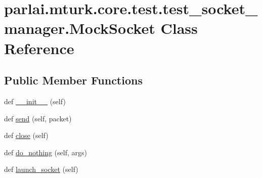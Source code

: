 \hypertarget{classparlai_1_1mturk_1_1core_1_1test_1_1test__socket__manager_1_1MockSocket}{}\section{parlai.\+mturk.\+core.\+test.\+test\+\_\+socket\+\_\+manager.\+Mock\+Socket Class Reference}
\label{classparlai_1_1mturk_1_1core_1_1test_1_1test__socket__manager_1_1MockSocket}
\subsection*{Public Member Functions}
\begin{DoxyCompactItemize}
\item 
def \hyperlink{classparlai_1_1mturk_1_1core_1_1test_1_1test__socket__manager_1_1MockSocket_acddeda4f4770f8e85882192453fc899c}{\+\_\+\+\_\+init\+\_\+\+\_\+} (self)
\item 
def \hyperlink{classparlai_1_1mturk_1_1core_1_1test_1_1test__socket__manager_1_1MockSocket_a476b7c95ab63d6c5a43025f8edddf07a}{send} (self, packet)
\item 
def \hyperlink{classparlai_1_1mturk_1_1core_1_1test_1_1test__socket__manager_1_1MockSocket_ad93a46530112b62452a88ea08072777f}{close} (self)
\item 
def \hyperlink{classparlai_1_1mturk_1_1core_1_1test_1_1test__socket__manager_1_1MockSocket_ac6e66202fba2b24eddd6652e5737efbe}{do\+\_\+nothing} (self, args)
\item 
def \hyperlink{classparlai_1_1mturk_1_1core_1_1test_1_1test__socket__manager_1_1MockSocket_ab7655efd9917e454f660492399659d5b}{launch\+\_\+socket} (self)
\end{DoxyCompactItemize}
